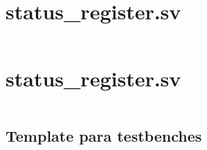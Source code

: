 \documentclass[
	12pt,				  %
	openright,		%
	a4paper,			%
	english,			%
	french,				%
	spanish,			%
	brazil,				%
]{abntex2}
\begin{document}
\begin{apendicesenv}
	\chapter{status{\_}register.sv}\label{attach:control_signals}

	\inputminted[breaklines]{systemverilog}{../quartus/synthesis/enums/control_signals.sv}

	\chapter{status{\_}register.sv}\label{attach:instruction_set}
	\inputminted[breaklines]{systemverilog}{../quartus/synthesis/enums/instruction_set.sv}

\end{apendicesenv}



\begin{anexosenv}
	\chapter{Template para testbenches}\label{attach:template}
	\inputminted{systemverilog}{../quartus/testbenches/template.test.sv}
\end{anexosenv}


\clearpage



\printindex
\end{document}
